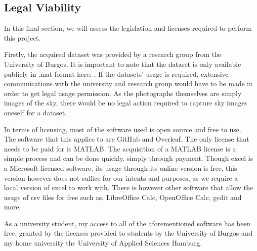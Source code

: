 \subsection{Legal Viability}
In this final section, we will assess the legislation and licenses required to perform this project.

Firstly, the acquired dataset was provided by a research group from the University of Burgos. It is important to note that the dataset is only available publicly in .mat format here: \cite{dataset:ANN}. If the datasets' usage is required, extensive communications with the university and research group would have to be made in order to get legal usage permission. As the photographs themselves are simply images of the sky, there would be no legal action required to capture sky images oneself for a dataset.

In terms of licensing, most of the software used is open source and free to use. The software that this applies to are GitHub and Overleaf. The only license that needs to be paid for is MATLAB. The acquisition of a MATLAB license is a simple process and can be done quickly, simply through payment. Though excel is a Microsoft licensed software, its usage through its online version is free, this version however does not suffice for our intents and purposes, as we require a local version of excel to work with. There is however other software that allow the usage of csv files for free \cite{relatable:csv}such as, LibreOffice Calc, OpenOffice Calc, gedit and more.

As a university student, my access to all of the aforementioned software has been free, granted by the licenses provided to students by the University of Burgos and my home university the University of Applied Sciences Hamburg.
